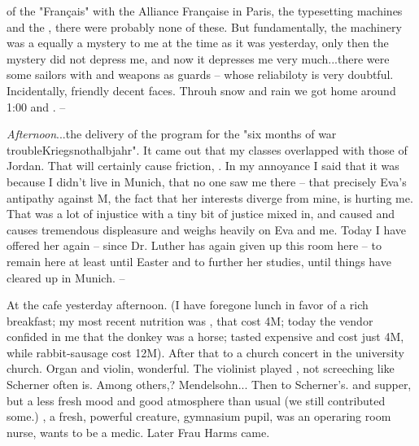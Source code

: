 of the "Français" with the Alliance Française in Paris, the typesetting machines and the , there were probably none of these. But fundamentally, the machinery was a equally a mystery to me at the time as it was yesterday, only then the mystery did not depress me, and now it depresses me very much...there were some sailors with  and weapons as guards -- whose reliabiloty is very doubtful. Incidentally, friendly decent faces. Throuh snow and rain we got home around 1:00 and . --

\textit{Afternoon}...the delivery of the program for the "{six months of war trouble}{Kriegsnothalbjahr}". It came out that my classes overlapped with those of Jordan. That will certainly cause friction, . In my annoyance I said that it was because I didn't live in Munich, that no one saw me there -- that precisely Eva's antipathy against M, the fact that her interests diverge from mine, is hurting me. That was a lot of injustice with a tiny bit of justice mixed in, and caused and causes tremendous displeasure and weighs heavily on Eva and me. Today I have offered her again -- since Dr. Luther has again given up this room here -- to remain here at least until Easter and to further her  studies, until things have cleared up in Munich. --

At the cafe yesterday afternoon. (I have foregone lunch in favor of a rich breakfast; my most recent nutrition was , that cost 4M; today the vendor confided in me that the donkey was a horse; tasted expensive and cost just 4M, while rabbit-sausage cost 12M). After that to a church concert in the university church. Organ and violin, wonderful. The violinist played , not screeching like Scherner often is. Among others,? Mendelsohn... Then to Scherner's.  and supper, but a less fresh mood and good atmosphere than usual (we still contributed some.) , a fresh, powerful creature, gymnasium pupil, was an operaring room nurse, wants to be a medic. Later Frau Harms came.

